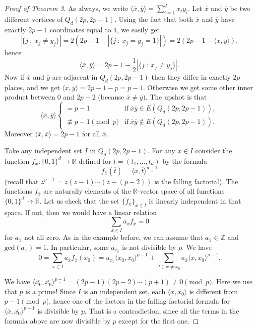 \documentclass[a4paper]{article}
\theoremstyle{plain}
\theoremstyle{myremark}
\newcommand{\oo}[1]{\overline{#1}}
\newcommand{\RR}{\mathbb{R}}
\newcommand{\ZZ}{\mathbb{Z}}
\begin{document}
\begin{proof}[Proof of Theorem 3]
As always, we write $\langle \oo{x},\oo{y}\rangle=\sum_{i=1}^dx_iy_i$. Let $\oo{x}$ and $\oo{y}$ be two different vertices of $Q_d(2p,2p-1)$. Using the fact that both $\oo{x}$ and $\oo{y}$ have exactly $2p-1$ coordinates equal to $1$, we easily get 
$$|\{j~:~x_j\neq y_j\}|=2(2p-1-|\{j~:~x_j=y_j=1\}|)=2(2p-1-\langle\oo{x},\oo{y}\rangle),$$
hence
$$\langle \oo{x},\oo{y}\rangle=2p-1-\frac12|\{j~:~x_j\neq y_j\}|.$$
Now if $\oo{x}$ and $\oo{y}$ are adjacent in $Q_d(2p,2p-1)$ then they differ in exactly $2p$ places, and we get $\langle\oo{x},\oo{y}\rangle=2p-1-p=p-1$. Otherwise we get some other inner product between $0$ and $2p-2$ (because $\oo{x}\neq\oo{y})$. The upshot is that
$$
\langle\oo{x},\oo{y}\rangle
\begin{cases}
=p-1 & \textrm{if}\ \oo{x}\oo{y}\in E(Q_d(2p,2p-1)),\\
\not\equiv p-1 \pmod{p} &  \textrm{if}\ \oo{x}\oo{y}\not\in E(Q_d(2p,2p-1)).
\end{cases}
$$
Moreover $\langle \oo{x},\oo{x}\rangle=2p-1$ for all $\oo{x}$.

\smallskip
Take any independent set $I$ in $Q_d(2p,2p-1)$. For any $\oo{x}\in I$ consider the function $f_{\oo{x}}:\{0,1\}^d\to\RR$ defined for $\oo{t}=(t_1,\ldots,t_d)$ by the formula
$$f_{\oo{x}}(\oo{t}) = \langle\oo{x},\oo{t}\rangle^{\underline{p-1}}$$
(recall that $z^{\underline{p-1}}=z(z-1)\cdots(z-(p-2))$ is the falling factorial).
The functions $f_{\oo{x}}$ are naturally elements of the $\RR$-vector space of all functions $\{0,1\}^d\to\RR$. Let us check that the set $\{f_{\oo{x}}\}_{\oo{x}\in I}$ is linearly independent in that space. If not, then we would have a linear relation
$$\sum_{\oo{x}\in I}a_{\oo{x}}f_{\oo{x}}=0$$
for $a_{\oo{x}}$ not all zero. As in the example before, we can assume that $a_{\oo{x}}\in\ZZ$ and $\textrm{gcd}(a_{\oo{x}})=1$. In particular, some $a_{\oo{x_0}}$ is not divisible by $p$. We have
$$0=\sum_{\oo{x}\in I}a_{\oo{x}}f_{\oo{x}}(\oo{x_0})=
a_{\oo{x_0}}\langle\oo{x_0},\oo{x_0}\rangle^{\underline{p-1}}+
\sum_{I\ni \oo{x}\neq\oo{x_0}}a_{\oo{x}}\langle\oo{x},\oo{x_0}\rangle^{\underline{p-1}}.
$$

We have $\langle\oo{x_0},\oo{x_0}\rangle^{\underline{p-1}}=(2p-1)(2p-2)\cdots(p+1)\neq 0 \pmod{p}$. Here we use that $p$ is a prime! Since $I$ is an independent set, each $\langle\oo{x},\oo{x_0}\rangle$ is different from $p-1 \pmod{p}$, hence one of the factors in the falling factorial formula for $\langle\oo{x},\oo{x_0}\rangle^{\underline{p-1}}$ is divisible by $p$. That is a contradiction, since all the terms in the formula above are now divisible by $p$ except for the first one.


\end{proof}
\end{document}
